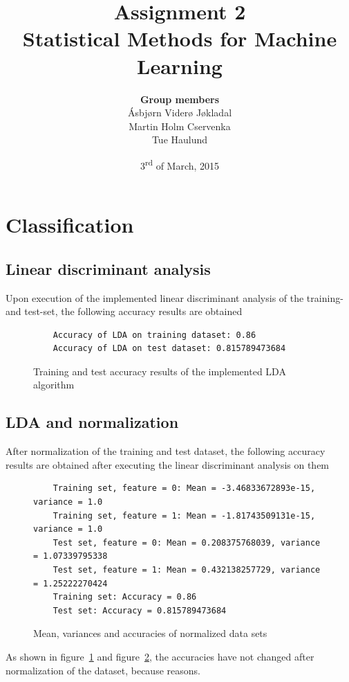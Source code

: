 \documentclass[a4paper]{article}
\title{\textbf{Assignment 2} \\ \small Statistical Methods for Machine Learning }
\author{\textbf{Group members}\\
        Ásbjørn Viderø Jøkladal\\
        Martin Holm Cservenka\\
        Tue Haulund}
\date{3\textsuperscript{rd} of March, 2015}
\begin{document}
\maketitle
\tableofcontents
\newpage

\section{Classification}

\subsection{Linear discriminant analysis}
Upon execution of the implemented linear discriminant analysis of the training- and test-set, the following accuracy results are obtained
\begin{figure}[H]
	\begin{lstlisting}
	Accuracy of LDA on training dataset: 0.86
	Accuracy of LDA on test dataset: 0.815789473684
	\end{lstlisting}
	\caption{Training and test accuracy results of the implemented LDA algorithm}
	\label{fig:lda_results}
\end{figure}

\subsection{LDA and normalization}
After normalization of the training and test dataset, the following accuracy results are obtained after executing the linear discriminant analysis on them
\begin{figure}[H]
	\begin{lstlisting}
	Training set, feature = 0: Mean = -3.46833672893e-15, variance = 1.0
	Training set, feature = 1: Mean = -1.81743509131e-15, variance = 1.0
	Test set, feature = 0: Mean = 0.208375768039, variance = 1.07339795338
	Test set, feature = 1: Mean = 0.432138257729, variance = 1.25222270424
	Training set: Accuracy = 0.86
	Test set: Accuracy = 0.815789473684
	\end{lstlisting}
	\caption{Mean, variances and accuracies of normalized data sets}
	\label{fig:lda_norm_results}
\end{figure}

As shown in figure~\ref{fig:lda_results} and figure~\ref{fig:lda_norm_results}, the accuracies have not changed after normalization of the dataset, because reasons. 
\end{document}
